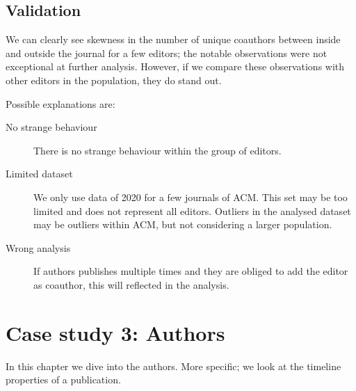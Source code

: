 \documentclass{ou-report}
\newcommand{\outline}[1]{{\color{blue} #1}}
\begin{document}

\section{Validation}
We can clearly see skewness in the number of unique coauthors between 
inside and outside the journal for a few editors; the notable observations were 
not exceptional at further analysis.
However, if we compare these observations with other editors in the population,
they do stand out.

Possible explanations are:
\begin{description}
    \item[No strange behaviour] There is no strange behaviour within the group 
        of editors.
    \item[Limited dataset] We only use data of 2020 for a few journals of ACM. 
        This set may be too limited and does not represent all editors. Outliers
        in the analysed dataset may be outliers within ACM, but not considering
        a larger population.
    \item[Wrong analysis] If authors publishes multiple times and they are 
        obliged to add the editor as coauthor, this will reflected in the 
        analysis.
\end{description}

\chapter{Case study 3: Authors}
\label{chp:case3}
In this chapter we dive into the authors. More specific; we look at the timeline
properties of a publication.
\end{document}
